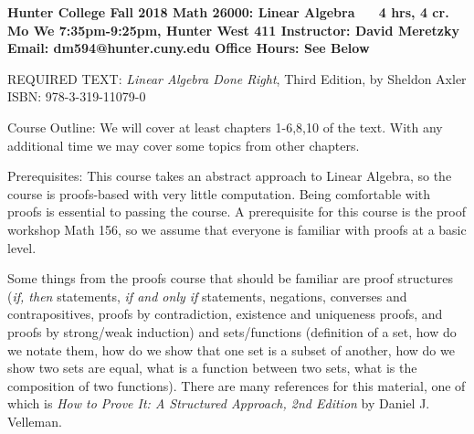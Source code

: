 \documentclass{article}
\begin{document}
	{\bfseries Hunter College
		\newline Fall 2018
		\newline Math 26000: Linear Algebra $\;\;\;\;$ 4 hrs, 4 cr. 
		\newline Mo We 7:35pm-9:25pm, Hunter West 411
		\newline Instructor: David Meretzky
		\newline Email: dm594@hunter.cuny.edu
		\newline Office Hours: See Below
		}
	
	REQUIRED TEXT: \textit{Linear Algebra Done Right}, Third Edition, by Sheldon Axler ISBN: 978-3-319-11079-0
	
	Course Outline: We will cover at least chapters 1-6,8,10 of the text. With any additional time we may cover some topics from other chapters. 
	
	Prerequisites: This course takes an abstract approach to Linear Algebra, so the course is proofs-based with very little computation. Being comfortable with proofs is essential to passing the course. A prerequisite for this course is the proof workshop Math 156, so we assume that everyone is familiar with proofs at a basic level. 
	
	Some things from the proofs course that should be familiar are proof structures  (\textit{if, then} statements, \textit{if and only if} statements, negations, converses and contrapositives, proofs by contradiction, existence and uniqueness proofs, and proofs by strong/weak induction) and sets/functions  (definition of a set, how do we notate them, how do we show that one set is a subset of another, how do we show two sets are equal, what is a function between two sets, what is the composition of two functions). There are many references for this material, one of which is \textit{How to Prove It: A Structured Approach, 2nd Edition} by Daniel J. Velleman.
	\begin{comment}\begin{enumerate} \item proof structures \begin{itemize}\item if, then \item if and only if \item converse, contrapositive \item contradiction \item existence and uniqueness \item induction\end{itemize} \item \begin{itemize} \item what are sets, and how do we notate them? \item how to show that one set is a subset of another set \item how to show two sets are equal \item what is a function between two abstract sets? \item composition of functions? \end{itemize}\end{enumerate}\end{comment}
	
\end{document}
